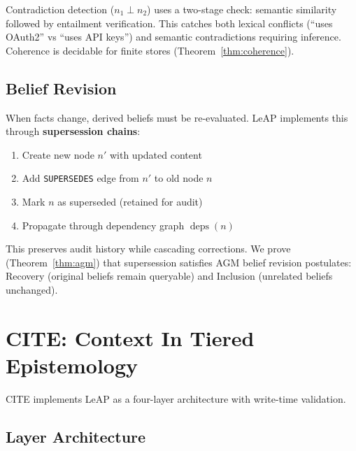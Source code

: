\documentclass[11pt,letterpaper]{article}
\begin{document}
Contradiction detection ($n_1 \perp n_2$) uses a two-stage check: semantic similarity followed by entailment verification. This catches both lexical conflicts (``uses OAuth2'' vs ``uses API keys'') and semantic contradictions requiring inference. Coherence is decidable for finite stores (Theorem~\ref{thm:coherence}).

\subsection{Belief Revision}

When facts change, derived beliefs must be re-evaluated. LeAP implements this through \textbf{supersession chains}:

\begin{enumerate}[noitemsep]
    \item Create new node $n'$ with updated content
    \item Add \texttt{SUPERSEDES} edge from $n'$ to old node $n$
    \item Mark $n$ as superseded (retained for audit)
    \item Propagate through dependency graph $\operatorname{deps}(n)$
\end{enumerate}

This preserves audit history while cascading corrections. We prove (Theorem~\ref{thm:agm}) that supersession satisfies AGM belief revision postulates: Recovery (original beliefs remain queryable) and Inclusion (unrelated beliefs unchanged).

\section{CITE: Context In Tiered Epistemology}
\label{sec:cite}

CITE implements LeAP as a four-layer architecture with write-time validation.

\subsection{Layer Architecture}
\end{document}
